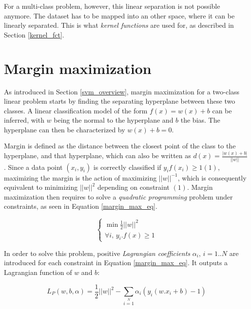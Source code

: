 \noindent For a multi-class problem, however, this linear separation is not possible anymore. The dataset has to be mapped into an other space, where it can be linearly separated. This is what \textit{kernel functions} are used for, as described in Section \ref{kernel_fct}.
\newline

\section{Margin maximization}
\label{margin_max}

\vspace{\baselineskip}
\noindent As introduced in Section \ref{svm_overview}, margin maximization for a two-class linear problem starts by finding the separating hyperplane between these two classes. A linear classification model of the form $f(x) = w(x) + b$ can be inferred, with $w$ being the normal to the hyperplane and $b$ the bias. The hyperplane can then be characterized by  $w(x) + b = 0$.
\newline

\noindent Margin is defined as the distance between the closest point of the class to the hyperplane, and that hyperplane, which can also be written as $ d(x) = \frac{|w(x) + b |}{||w||}$. Since a data point $(x_i, y_i)$ is correctly classified if $y_if(x_i) \geq 1 (1)$, maximizing the margin is the action of maximizing $||w||^{-1}$, which is consequently equivalent to minimizing $||w||^2$ depending on constraint $(1)$. Margin maximization then requires to solve a \textit{quadratic programming} problem under constraints, as seen in Equation \ref{margin_max_eq}.

\begin{equation}
\left\{
\begin{array}{l}
\min \frac{1}{2} ||w||^2 \\
\forall i, \, y_i . f(x) \geq 1
\end{array}
\right.
\label{margin_max_eq}
\end{equation}
\vspace{\baselineskip}

\noindent In order to solve this problem, positive \textit{Lagrangian coefficients} $\alpha_i$, $i=1..N$ are introduced for each constraint in Equation \ref{margin_max_eq}. It outputs a Lagrangian function of $w$ and $b$:

\begin{equation}
L_P(w, b,\alpha) = \frac{1}{2}||w||^2 - \sum\limits_{i=1}\limits^{N}\alpha_i\left(y_i(w.x_i + b) -1\right)
\label{lagrangian}
\end{equation}
\vspace{\baselineskip}

